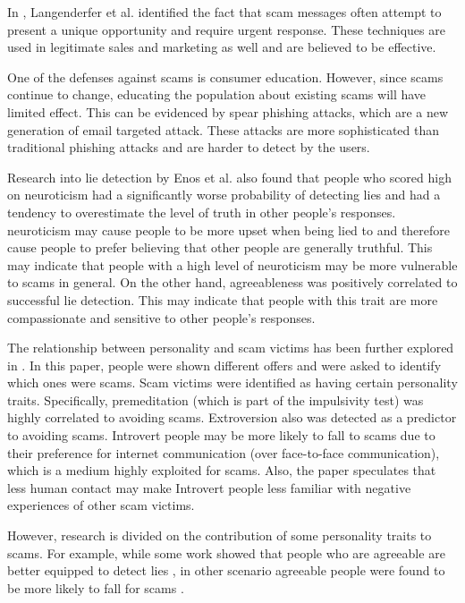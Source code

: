\documentclass{sig-alternate}
\begin{document}
In \cite{LS01}, Langenderfer et al. identified the fact that scam messages often attempt to present a unique opportunity and require urgent response. These techniques are used in legitimate sales and marketing as well and are believed to be effective.  

One of the defenses against scams is consumer education. However, since scams continue to change, educating the population about existing scams will have limited effect. This can be evidenced by spear phishing attacks, which are a new generation of email targeted attack. These attacks are more sophisticated than traditional phishing attacks and are harder to detect by the users. 


Research into lie detection 
by Enos et al. 
\cite{EBCG06} also found that people who scored high on neuroticism had a significantly worse probability of detecting lies and had a tendency to overestimate the level of truth in other people's responses. neuroticism may cause people to be more upset when being lied to and therefore cause people to prefer believing that other people are generally truthful. This may indicate that people with a high level of neuroticism may be more vulnerable to scams in general. On the other hand, agreeableness was positively correlated to successful lie detection. This may indicate that people with this trait are more compassionate and sensitive to other people's responses.





The relationship between personality and scam victims has been further explored in \cite{ML12}. In this paper, people were shown different offers and were asked to identify which ones were scams. Scam victims were identified as having certain personality traits. Specifically, premeditation (which is part of the impulsivity test) was highly correlated to avoiding scams. Extroversion also was detected as a predictor to avoiding scams. Introvert people may be more likely to fall to scams due to their preference for internet communication (over face-to-face communication), which is a medium highly exploited for scams. Also, the paper speculates that less human contact may make Introvert people less familiar with negative experiences of other scam victims. 

However, research is divided on the contribution of some personality traits to scams. For example, while some work showed that people who are agreeable are better equipped to detect lies \cite{EBCG06}, in other scenario agreeable people were found to be more likely to fall for scams \cite{ML12}. 
\end{document}
